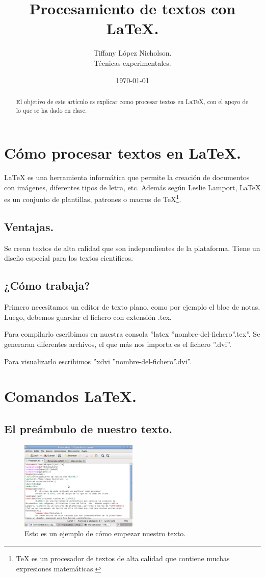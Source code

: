 \documentclass[a4paper]{article}
\begin{document}
\title{Procesamiento de textos con \LaTeX.}
\author{Tiffany López Nicholson. \\
Técnicas experimentales.}
\date{\today}
\maketitle
\begin{abstract}
	El objetivo de este artículo es explicar como procesar 
	textos en \LaTeX, con el apoyo de lo que se ha dado en clase.	
\end{abstract}
\section{Cómo procesar textos en \LaTeX.}
	\LaTeX{} es una herramienta informática que permite la creación de documentos con imágenes, diferentes tipos de letra, etc. Además según Leslie Lamport, \LaTeX{} es un conjunto de plantillas, patrones o macros de TeX\footnote{TeX es un procesador de textos de alta calidad que contiene muchas expresiones matemáticas.\cite{2}}.
	\subsection{Ventajas.}
	Se crean textos de alta calidad que son independientes de la plataforma. Tiene un diseño  especial para los textos científicos.
	\subsection{¿Cómo trabaja?}
	Primero necesitamos un editor de texto plano, como por ejemplo el bloc de notas. Luego, debemos guardar el fichero con extensión .tex.\par
Para compilarlo escribimos en nuestra consola ''latex ''nombre-del-fichero''.tex''. Se generaran diferentes archivos, el que más nos importa es el fichero ''.dvi''.\par
Para visualizarlo escribimos ''xdvi ''nombre-del-fichero''.dvi''.
\section{Comandos \LaTeX.}
	\subsection{El preámbulo de nuestro texto.}
\begin{figure}
\begin{center}
\includegraphics[width=0.5\textwidth]{pant.eps}
\caption{\small Esto es un ejemplo de cómo empezar nuestro texto.}
\end{center}
\end{figure}
	
\end{document}
